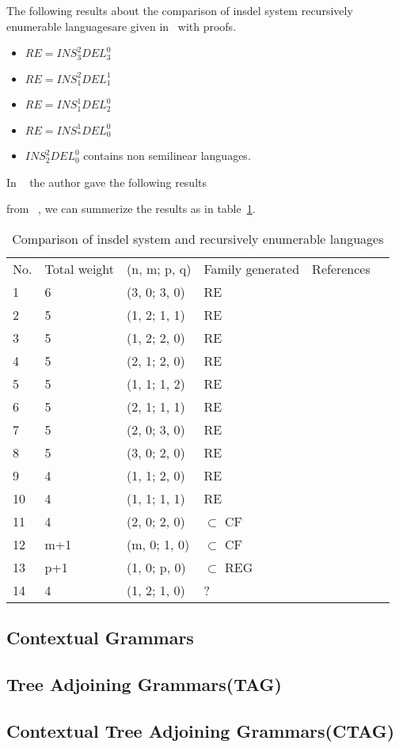 The following results about the comparison of insdel system recursively enumerable languagesare given in~\cite{paun} with proofs.
\begin{itemize}
\item $RE=INS_3^2 DEL_3^0$
\item $RE=INS_1^2 DEL_1^1$
\item $RE=INS_1^1 DEL_2^0$
\item $RE=INS_*^1 DEL_0^0$
\item $INS_2^2 DEL_0^0$ contains non semilinear languages.
\end{itemize}

In ~\cite{madhu} the author gave the following results

from ~\cite{paun,margentern,verlan,madhu}, we can summerize the results as in table~\ref{ins_tble1}.
\begin{table}
\begin{tabular}{llllll}
No.&  Total weight& (n, m; p, q)& Family generated &References\\
\cline{1-5}
1 &6 &(3, 0; 3, 0)& RE &~\cite{margentern}\\
2 &5 &(1, 2; 1, 1)& RE &~\cite{lila,paun}\\
3 &5 &(1, 2; 2, 0)& RE &~\cite{lila,paun}\\
4 &5 &(2, 1; 2, 0) &RE &~\cite{lila,paun}\\
5 &5 &(1, 1; 1, 2)& RE &~\cite{akihiro}\\
6 &5 &(2, 1; 1, 1)& RE &~\cite{akihiro}\\
7 &5 &(2, 0; 3, 0)& RE &~\cite{margentern}\\
8 &5 &(3, 0; 2, 0) &RE &~\cite{margentern}\\
9 &4 &(1, 1; 2, 0) &RE &~\cite{paun}\\
10 &4 &(1, 1; 1, 1)& RE &~\cite{akihiro}\\
11 &4 &(2, 0; 2, 0)& $\subset$ CF &~\cite{verlan}\\
12 &m+1 &(m, 0; 1, 0)&$\subset$ CF &~\cite{verlan}\\
13 &p+1 &(1, 0; p, 0)&$\subset$ REG &~\cite{verlan}\\
14 &4 &(1, 2; 1, 0)& ? &\\
 

\end{tabular}
\label{ins_tble1}
\caption{Comparison of insdel system and recursively enumerable languages}
\end{table}


\subsection{Contextual Grammars}

\subsection{Tree Adjoining Grammars(TAG)}

\subsection{Contextual Tree Adjoining Grammars(CTAG)}

